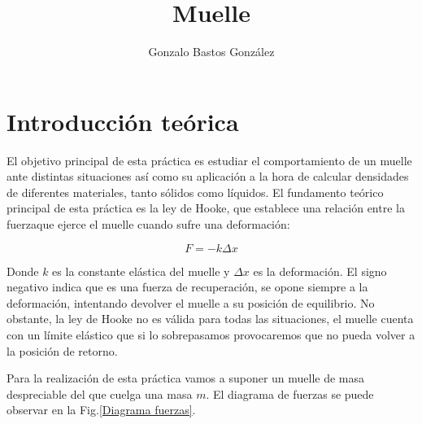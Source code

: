 \documentclass[a4paper,12pt,titlepage]{article}
\title{Muelle}
\author{Gonzalo Bastos González}
\begin{document}
\maketitle
\tableofcontents

\newpage

\section{Introducción teórica}

El objetivo principal de esta práctica es estudiar el comportamiento de un muelle ante distintas situaciones así como su aplicación a la hora de calcular densidades de diferentes materiales, tanto sólidos como líquidos. El fundamento teórico principal de esta práctica es la ley de Hooke, que establece una relación entre la fuerzaque ejerce el muelle cuando sufre una deformación:

\begin{equation}
    F = -k\Delta x
\end{equation}

Donde $k$ es la constante elástica del muelle y $\Delta x$ es la deformación. El signo negativo indica que es una fuerza de recuperación, se opone siempre a la deformación, intentando devolver el muelle a su posición de equilibrio. No obstante, la ley de Hooke no es válida para todas las situaciones, el muelle cuenta con un límite elástico que si lo sobrepasamos provocaremos que no pueda volver a la posición de retorno.

\par Para la realización de esta práctica vamos a suponer un muelle de masa despreciable del que cuelga una masa $m$. El diagrama de fuerzas se puede observar en la Fig.\ref{Diagrama fuerzas}.
\end{document}
